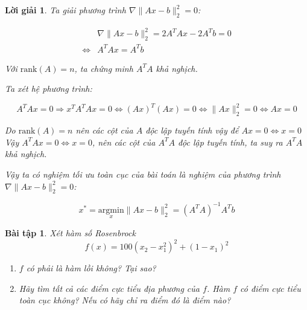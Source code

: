 \documentclass[14pt, a4paper]{article}
\theoremstyle{sltheorem}
\newtheorem{baitap}{Bài tập}
\theoremstyle{soltheorem}
\newtheorem*{loigiai}{Lời giải}
\begin{document}
\begin{loigiai}
        Ta giải phương trình $\nabla \lVert Ax - b \rVert_2^2=0$:

        \begin{equation*}
            \begin{aligned}
                &\nabla \lVert Ax - b \rVert_2^2 = 2 A^T A x - 2 A^T b = 0 \\
                \Leftrightarrow &A^T A x=A^T b
            \end{aligned}
        \end{equation*}

        Với $\mathrm{rank}(A)=n$, ta chứng minh $A^T A$ khả nghịch.

        Ta xét hệ phương trình:

        \begin{equation*}
            A^T A x = 0 \Rightarrow x^T A^T A x = 0 \Leftrightarrow (Ax)^T (Ax) = 0 \Leftrightarrow \lVert Ax \rVert_2^2 =0 \Leftrightarrow Ax = 0
        \end{equation*}

        Do $\mathrm{rank}(A)=n$ nên các cột của $A$ độc lập tuyến tính vậy để $Ax=0 \Leftrightarrow x = 0$
        Vậy $A^T A x = 0 \Leftrightarrow x = 0$, nên các cột của $A^T A$ độc lập tuyến tính, ta suy ra $A^T A$ khả nghịch.

        Vậy ta có nghiệm tối ưu toàn cục của bài toán là nghiệm của phương trình $\nabla \lVert Ax - b \rVert_2^2=0$:

        \begin{equation*}
            x^* = \underset{x}{\mathrm{argmin}}\lVert Ax - b \rVert_2^2=(A^TA)^{-1}A^T b
        \end{equation*}
    \end{loigiai}

    \begin{baitap}
        Xét hàm số Rosenbrock
        \begin{equation*}
            f(x)=100(x_2 - x_1^2)^2 + (1-x_1)^2
        \end{equation*}
        \begin{enumerate}[wide, labelwidth=!, labelindent=0pt,label=\textbf{\arabic*}.]
            \item $f$ có phải là hàm lồi không? Tại sao?
            \item Hãy tìm tất cả các điểm cực tiểu địa phương của $f$. Hàm $f$ có điểm cực tiểu toàn cục không? Nếu có hãy chỉ ra điểm đó là điểm nào?
        \end{enumerate}
    \end{baitap}
\end{document}

